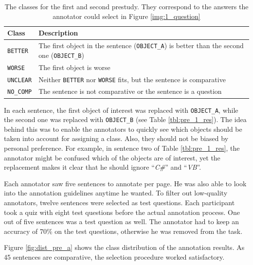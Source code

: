 \begin{table}[thb]
\centering
\caption{The classes for the first and second prestudy. They correspond to the answers the annotator could select in Figure \ref{img:1_question}}
\label{tbl:prestudyclasses-a}
\begin{tabularx}{\linewidth}{lX}

\toprule
Class & Description \\ \midrule
\texttt{BETTER} & The first object in the sentence (\texttt{OBJECT\_A}) is better than the second one (\texttt{OBJECT\_B})\\
\texttt{WORSE} & The first object is worse \\
\texttt{UNCLEAR} & Neither \texttt{BETTER} nor \texttt{WORSE} fits, but the sentence is comparative\\
\texttt{NO\_COMP} & The sentence is not comparative or the sentence is a question\\
\bottomrule
\end{tabularx}
\end{table}

In each sentence, the first object of interest was replaced with \texttt{OBJECT\_A}, while the second one was replaced with \texttt{OBJECT\_B} (see Table \ref{tbl:pre_1_res}). The idea behind this was to enable the annotators to quickly see which objects should be taken into account for assigning a class. Also, they should not be biased by personal preference. For example, in sentence two of Table \ref{tbl:pre_1_res}, the annotator might be confused which of the objects are of interest, yet the replacement makes it clear that he should ignore \enquote{\emph{C\#}} and \enquote{\emph{VB}}. 

Each annotator saw five sentences to annotate per page. He was also able to look into the annotation guidelines anytime he wanted. To filter out low-quality annotators, twelve sentences were selected as test questions. Each participant took a quiz with eight test questions before the actual annotation process. One out of five sentences was a test question as well. The annotator had to keep an accuracy of 70\% on the test questions, otherwise he was removed from the task.

Figure \ref{fig:dist_pre_a} shows the class distribution of the annotation results. As 45 sentences are comparative, the selection procedure worked satisfactory.


